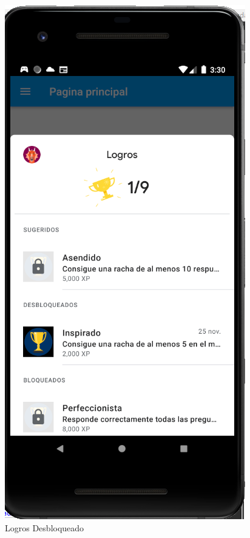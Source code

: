 \documentclass{article}
\begin{document}
\begin{figure}[H]
    \centering
    \includegraphics[scale=0.8]{imgs/Test/LogroDes2}
    \caption{Logros Desbloqueado}
\end{figure}
\pagebreak
\printbibliography
\end{document}
